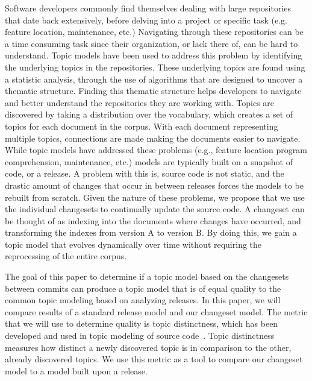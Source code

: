 Software developers commonly find themselves dealing with large repositories that date back extensively, before delving into a project or specific task (e.g. feature location, maintenance, etc.)
Navigating through these repositories can be a time consuming task since their organization, or lack there of, can be hard to understand.
Topic models have been used to address this problem by identifying the underlying topics in the repositories.
These underlying topics are found using a statistic analysis, through the use of algorithms that are designed to uncover a thematic structure.
Finding this thematic structure helps developers to navigate and better understand the repositories they are working with.
Topics are discovered by taking a distribution over the vocabulary, which creates a set of topics for each document in the corpus.
With each document representing multiple topics, connections are made making the documents easier to navigate.
While topic models have addressed these problems (e.g., feature location program comprehension, maintenance, etc.) models are typically built on a snapshot of code, or a release.
A problem with this is, source code is not static, and the drastic amount of changes that occur in between releases forces the models to be rebuilt from scratch.
Given the nature of these problems, we propose that we use the individual changesets to continually update the source code.
A changeset can be thought of as indexing into the documents where changes have occurred, and transforming the indexes from version A to version B.
By doing this, we gain a topic model that evolves dynamically over time without requiring the reprocessing of the entire corpus.

The goal of this paper to determine if a topic model based on the changesets between commits can produce a topic model that is of equal quality to the common topic modeling based on analyzing releases.
In this paper, we will compare results of a standard release model and our changeset model.
The metric that we will use to determine quality is topic distinctness,
which has been developed and used in topic modeling of source
code~\cite{Wei-etal:2010, Thomas-etal:2011, Chuang-etal:2012}.
Topic distinctness measures how distinct a newly discovered topic is in
comparison to the other, already discovered topics.
We use this metric as a  tool to compare our changeset model to a model built upon a release.




